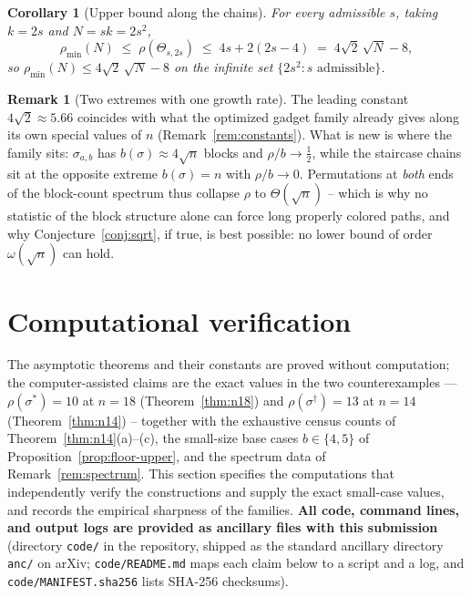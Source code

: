 \documentclass[11pt]{article}
\newtheorem{corollary}[theorem]{Corollary}
\theoremstyle{definition}
\newtheorem{remark}[theorem]{Remark}
\newcommand{\pmin}{\rho_{\min}}
\begin{document}
\begin{corollary}[Upper bound along the chains]\label{cor:stairconst}
For every admissible $s$, taking $k = 2s$ and $N = sk = 2s^2$,
\[
  \pmin(N) \;\le\; \rho(\Theta_{s,2s}) \;\le\; 4s + 2(2s - 4) \;=\; 4\sqrt2\,\sqrt N - 8 ,
\]
so $\pmin(N) \le 4\sqrt2\,\sqrt N - 8$ on the infinite set
$\{2s^2 : s \text{ admissible}\}$.
\end{corollary}

\begin{remark}[Two extremes with one growth rate]\label{rem:extremes}
The leading constant $4\sqrt 2 \approx 5.66$ coincides with what the optimized gadget
family already gives along its own special values of $n$
(Remark~\ref{rem:constants}). What is new is where the family sits:
$\sigma_{a,b}$ has $b(\sigma) \approx 4\sqrt n$ blocks and
$\rho/b \to \tfrac12$, while the staircase chains sit at the opposite extreme
$b(\sigma) = n$ with $\rho/b \to 0$. Permutations at \emph{both} ends of the
block-count spectrum thus collapse $\rho$ to $\Theta(\sqrt n)$ -- which is why no
statistic of the block structure alone can force long properly colored paths, and why
Conjecture~\ref{conj:sqrt}, if true, is best possible: no lower bound of order
$\omega(\sqrt n)$ can hold.
\end{remark}

\section{Computational verification}\label{sec:comp}

The asymptotic theorems and their constants are proved without computation; the
computer-assisted claims are the exact values in the two counterexamples ---
$\rho(\sigma^\ast)=10$ at $n=18$ (Theorem~\ref{thm:n18}) and
$\rho(\sigma^\dagger)=13$ at $n=14$ (Theorem~\ref{thm:n14}) -- together with the
exhaustive census counts of Theorem~\ref{thm:n14}(a)--(c), the small-size base cases
$b \in \{4,5\}$ of Proposition~\ref{prop:floor-upper}, and the spectrum data of
Remark~\ref{rem:spectrum}. This section specifies the computations that independently
verify the constructions and supply the exact small-case values, and records the
empirical sharpness of the families.
\textbf{All code, command lines, and output logs are provided as ancillary files with
this submission} (directory \texttt{code/} in the repository, shipped as the standard
ancillary directory \texttt{anc/} on arXiv; \texttt{code/README.md} maps each claim
below to a script and a log, and \texttt{code/MANIFEST.sha256} lists SHA-256 checksums).
\end{document}
